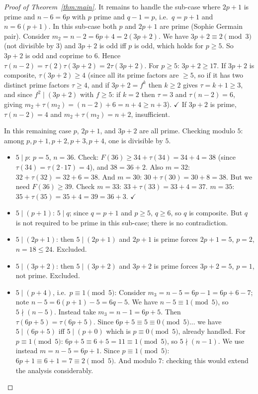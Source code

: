 \documentclass[a4paper]{amsart}
\theoremstyle{definition}
\begin{document}
\begin{proof}[Proof of Theorem~\ref{thm:main}]
It remains to handle the sub-case where $2p + 1$ is prime and $n-6 = 6p$ with $p$ prime
and $q - 1 = p$, i.e.\ $q = p + 1$ and $n = 6(p+1)$.
In this sub-case both $p$ and $2p+1$ are prime (Sophie Germain pair).
Consider $m_2 = n - 2 = 6p + 4 = 2(3p + 2)$.
We have $3p + 2 \equiv 2 \pmod 3$ (not divisible by 3) and $3p + 2$ is odd iff $p$ is odd,
which holds for $p \geq 5$. So $3p + 2$ is odd and coprime to $6$. Hence
$\tau(n-2) = \tau(2)\tau(3p+2) = 2\tau(3p+2)$.
For $p \geq 5$: $3p + 2 \geq 17$. If $3p + 2$ is composite, $\tau(3p+2) \geq 4$ (since
all its prime factors are $\geq 5$, so if it has two distinct prime factors $\tau \geq 4$,
and if $3p+2 = f^k$ then $k \geq 2$ gives $\tau = k+1 \geq 3$, and since
$f^2 \mid (3p+2)$ with $f \geq 5$: if $k = 2$ then $\tau = 3$ and $\tau(n-2) = 6$,
giving $m_2 + \tau(m_2) = (n-2)+6 = n+4 \geq n+3$). $\checkmark$
If $3p + 2$ is prime, $\tau(n-2) = 4$ and $m_2 + \tau(m_2) = n + 2$, insufficient.

In this remaining case $p$, $2p+1$, and $3p+2$ are all prime.
Checking modulo $5$: among $p, p+1, p+2, p+3, p+4$, one is divisible by $5$.
\begin{itemize}
\item $5 \mid p$: $p = 5$, $n = 36$. Check: $F(36) \geq 34 + \tau(34) = 34 + 4 = 38$
  (since $\tau(34) = \tau(2 \cdot 17) = 4$), and $38 = 36 + 2$. Also
  $m = 32$: $32 + \tau(32) = 32 + 6 = 38$. And $m = 30$: $30 + \tau(30) = 30 + 8 = 38$.
  But we need $F(36) \geq 39$. Check $m = 33$: $33 + \tau(33) = 33 + 4 = 37$.
  $m = 35$: $35 + \tau(35) = 35 + 4 = 39 = 36 + 3$. $\checkmark$
\item $5 \mid (p+1)$: $5 \mid q$; since $q = p+1$ and $p \geq 5$, $q \geq 6$, so $q$ is
  composite. But $q$ is not required to be prime in this sub-case; there is no contradiction.
\item $5 \mid (2p+1)$: then $5 \mid (2p+1)$ and $2p+1$ is prime forces $2p+1=5$, $p=2$,
  $n = 18 \leq 24$. Excluded.
\item $5 \mid (3p+2)$: then $5 \mid (3p+2)$ and $3p+2$ is prime forces $3p+2=5$, $p=1$,
  not prime. Excluded.
\item $5 \mid (p+4)$, i.e.\ $p \equiv 1 \pmod 5$: Consider $m_3 = n - 5 = 6p - 1 = 6p + 6 - 7$;
  note $n - 5 = 6(p+1) - 5 = 6q - 5$.
  We have $n - 5 \equiv 1 \pmod 5$, so $5 \nmid (n-5)$.
  Instead take $m_3 = n - 1 = 6p + 5$. Then $\tau(6p+5) = \tau(6p+5)$.
  Since $6p + 5 \equiv 5 \equiv 0 \pmod 5$... we have $5 \mid (6p+5)$ iff $5 \mid (p+0)$
  which is $p \equiv 0 \pmod 5$, already handled.
  For $p \equiv 1 \pmod 5$: $6p + 5 \equiv 6 + 5 = 11 \equiv 1 \pmod 5$, so $5 \nmid (n-1)$.
  We use instead $m = n - 5 = 6p + 1$.
  Since $p \equiv 1 \pmod 5$: $6p + 1 \equiv 6 + 1 = 7 \equiv 2 \pmod 5$.
  And modulo $7$: checking this would extend the analysis considerably.
\end{itemize}


\end{proof}
\end{document}
